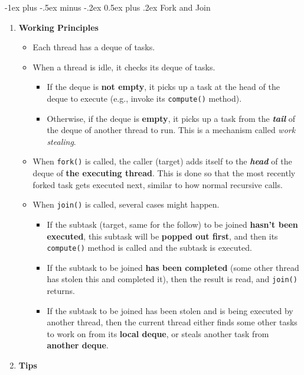 \documentclass[10pt, landscape]{article}
\makeatletter
\renewcommand{\section}{\@startsection{section}{1}{0mm}%
                                {-1ex plus -.5ex minus -.2ex}%
                                {0.5ex plus .2ex}%
                                {\normalfont\large\bfseries}}
\makeatother
\begin{document}
\begin{multicols}{4}
\section{Fork and Join}
\begin{enumerate}
    \item \textbf{Working Principles}
        \begin{itemize}
        \item Each thread has a deque of tasks.
        \item When a thread is idle, it checks its deque of tasks.
        \begin{itemize}
            \item If the deque is \textbf{not empty}, it picks up a task at the head of the deque to execute (e.g., invoke its \texttt{compute()} method).
            \item Otherwise, if the deque is \textbf{empty}, it picks up a task from the \textbf{\textit{tail}} of the deque of another thread to run. This is a mechanism called \textit{work stealing}.
        \end{itemize}
        \item When \texttt{fork()} is called, the caller (target) adds itself to the \textbf{\textit{head}} of the deque of \textbf{the executing thread}. This is done so that the most recently forked task gets executed next, similar to how normal recursive calls.
        \item When \texttt{join()} is called, several cases might happen.
        \begin{itemize}
            \item If the subtask (target, same for the follow) to be joined \textbf{hasn't been executed}, this subtask will be \textbf{popped out first}, and then its \texttt{compute()} method is called and the subtask is executed.
            \item If the subtask to be joined \textbf{has been completed} (some other thread has stolen this and completed it), then the result is read, and \texttt{join()} returns.
            \item If the subtask to be joined has been stolen and is being executed by another thread, then the current thread either finds some other tasks to work on from its \textbf{local deque}, or steals another task from \textbf{another deque}.
        \end{itemize}
    \end{itemize}
    \item \textbf{Tips}
    \begin{itemize}

\end{itemize}
\end{enumerate}
\end{multicols}
\end{document}
